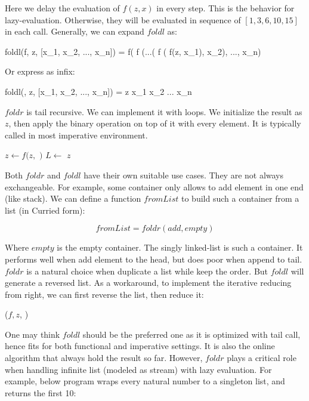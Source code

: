 \documentclass[b5paper]{article}
\begin{document}
Here we delay the evaluation of $f(z, x)$ in every step. This is the behavior for lazy-evaluation. Otherwise, they will be evaluated in sequence of $[1, 3, 6, 10, 15]$ in each call. Generally, we can expand $foldl$ as:

\be
foldl(f, z, [x_1, x_2, ..., x_n]) = f( f (...( f ( f(z, x_1), x_2), ..., x_n)
\ee

Or express as infix:

\be
foldl(\oplus, z, [x_1, x_2, ..., x_n]) = z \oplus x_1 \oplus x_2 \oplus ... \oplus x_n
\ee

$foldr$ is tail recursive. We can implement it with loops. We initialize the result as $z$, then apply the binary operation on top of it with every element. It is typically called  in most imperative environment.

\begin{algorithmic}[1]
    \State $z \gets f(z, $  $)$
    \State $L \gets$ 
  \EndWhile
  \State \Return $z$
\EndFunction
\end{algorithmic}

Both $foldr$ and $foldl$ have their own suitable use cases. They are not always exchangeable. For example, some container only allows to add element in one end (like stack). We can define a function $fromList$ to build such a container from a list (in Curried form):

\[
fromList = foldr(add, empty)
\]

Where $empty$ is the empty container. The singly linked-list is such a container. It performs well when add element to the head, but does poor when append to tail. $foldr$ is a natural choice when duplicate a list while keep the order. But $foldl$ will generate a reversed list. As a workaround, to implement the iterative reducing from right, we can first reverse the list, then reduce it:

\begin{algorithmic}[1]
  \State \Return {}($f, z$, )
\EndFunction
\end{algorithmic}

One may think $foldl$ should be the preferred one as it is optimized with tail call, hence fits for both functional and imperative settings. It is also the online algorithm that always hold the result so far. However, $foldr$ plays a critical role when handling infinite list (modeled as stream) with lazy evaluation. For example, below program wraps every natural number to a singleton list, and returns the first 10:
\end{document}
